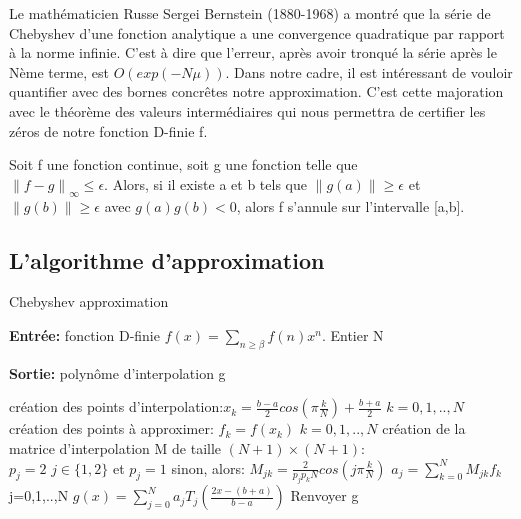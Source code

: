 \documentclass[a4paper,10.5pt]{article}
\begin{document}
	
	Le mathématicien Russe Sergei Bernstein (1880-1968) a montré que la série de Chebyshev d'une fonction analytique a une convergence quadratique par rapport à la norme infinie. C'est à dire que l'erreur, après avoir tronqué la série après le Nème terme, est $O(exp(-N\mu))$. Dans notre cadre, il est intéressant de vouloir quantifier avec des bornes concrêtes notre approximation.
	C'est cette majoration avec le théorème des valeurs intermédiaires qui nous permettra de certifier les zéros de notre fonction D-finie f.
	
	
	\begin{proposition}
		Soit f une fonction continue, soit g une fonction telle que \\
		$\left\|f-g \right\|_{\infty} \leq \epsilon$. Alors, si il existe a et b tels que $\left\|g(a)\right\| \geq \epsilon$ et $\left\|g(b)\right\| \geq \epsilon$ avec $g(a)g(b) < 0$, alors f s'annule sur l'intervalle [a,b].
		
	\end{proposition}
	
	\subsection{L'algorithme d'approximation}
	
	
	\begin{algorithm}
		\caption{Chebyshev approximation}
		
		\vspace{2mm}
		
		\textbf{Entrée:} fonction D-finie $f(x)=\sum_{n \geq\beta} f(n)x^{n}$. Entier N
		
		\textbf{Sortie:} polynôme d'interpolation g
		
		\begin{algorithmic}[1]
			
			\STATE création des points d'interpolation:$x_{k}=\frac{b-a}{2}cos(\pi\frac{k}{N})+\frac{b+a}{2}$  $k=0,1,..,N$
			\STATE création des points à approximer: $f_{k}=f(x_{k})$ $k=0,1,..,N$
			\STATE création de la matrice d'interpolation M de taille $(N+1)\times (N+1)$:\\
			$p_{j}=2$ $j\in\{1,2\}$ et $p_{j}=1$ sinon, alors:
			$M_{jk}=\frac{2}{p_{j}p_{k}N}cos(j\pi\frac{k}{N})$
			\STATE $a_{j}=\sum_{k=0}^{N}M_{jk}f_{k}$ j=0,1,..,N
			\STATE $g(x)=\sum_{j=0}^{N}a_{j}T_{j}(\frac{2x-(b+a)}{b-a})$
			\STATE Renvoyer g
		\end{algorithmic}
		
	\end{algorithm}
	
\end{document}
